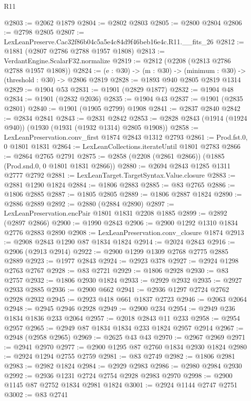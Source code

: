 \begin{lexlean}{R11}
\begin{coremodule}
@2803 := @2062 @1879
@2804 := @2802 @2803
@2805 := @2800 @2804
@2806 := @2798 @2805
@2807 := LexLeanPreserve.Cac32f86b04c5a5e4c84d9f46beb16e4c.R11.__fits_26
@2812 := @1881 (@2807 @2786 @2788 @1957 @1808)
@2813 := VerdantEngine.ScalarF32.normalize
@2819 := @2812 (@2208 (@2813 @2786 @2788 @1957 @1808))
@2824 := (e : @30) -> (m : @30) -> (minimum : @30) -> (threshold : @30) -> @2806 @2819
@2828 := @1893 @940 @2805 @2819 @1314
@2829 := @1904 @53
@2831 := @1901 (@2829 @1877)
@2832 := @1904 @48
@2834 := @1901 (@2832 @2036)
@2835 := @1904 @43
@2837 := @1901 (@2835 @2801)
@2840 := @1901 (@1905 @2799) @1908
@2841 := @2837 @2840
@2842 := @2834 @2841
@2843 := @2831 @2842
@2853 := @2828 @2843 (@1914 (@1924 @940)) (@1930 (@1931 (@1932 @1314) @2805 @1908))
@2858 := LexLeanPreservation.conv_first @1874 @2843 @1312 @2793
@2861 := Prod.fst.{0, 0} @1801 @1831
@2864 := LexLeanCollections.iterateUntil @1801 @2783
@2866 := @2864 @2765 @2791
@2875 := @2858 (@2208 (@2861 @2866)) (@1885 (Prod.snd.{0, 0} @1801 @1831 @2866))
@2880 := @2694 @2843 @1285 @1311 @2777 @2792
@2881 := LexLeanTarget.TargetSyntax.Value.closure
@2883 := @2881 @1290 @1824
@2884 := @1806 @2883
@2885 := @83 @2765
@2886 := @1806 @2885
@2887 := @1805 @2805
@2889 := @1806 @2887 @1824
@2890 := @2886 @2889
@2892 := @2880 (@2884 @2890)
@2897 := LexLeanPreservation.encPair @1801 @1831 @2208 @1885
@2899 := @2892 (@2897 @2866)
@2900 := @1990 @2843
@2906 := @2900 @1292 @1310 @1834 @2776 @2883 @2890
@2908 := LexLeanPreservation.conv_closure @1874
@2913 := @2908 @2843 @1290 @87 @1834 @1824
@2914 := @2024 @2843
@2916 := @2906 (@2913 @2914)
@2922 := @2900 @1299 @1309 @2768 @2775 @2885 @2889
@2923 := @1977 @2843
@2924 := @2923 @378
@2927 := @2924 @1298 @2763 @2767
@2928 := @83 @2721
@2929 := @1806 @2928
@2930 := @83 @2757
@2932 := @1806 @2930 @1824
@2933 := @2929 @2932
@2935 := @2927 @2933 @2885
@2936 := @2900 @662
@2941 := @2936 @1297 @2724 @2762 @2928 @2932
@2945 := @2923 @418 @661 @1837 @2723
@2946 := @2063 @2064
@2948 := @2945 @2946 @2928
@2949 := @2900 @234
@2954 := @2949 @236 @1834 @1836 @233 @2064
@2957 := @2018 @2843 @11 @233
@2958 := @2954 @2957
@2965 := @2949 @87 @1834 @1834 @233 @1824 @2957 @2914
@2967 := @2948 (@2958 @2965)
@2969 := @2625 @43 @43
@2970 := @2967 @2969
@2971 := @2941 @2970
@2977 := @2900 @1295 @87 @2760 @1834 @2930 @1824
@2980 := @2924 @1294 @2755 @2759
@2981 := @83 @2749
@2982 := @1806 @2981
@2983 := @2982 @1824
@2984 := @2929 @2983
@2986 := @2980 @2984 @2930
@2992 := @2936 @1231 @2724 @2754 @2928 @2983 @2970
@2998 := @2900 @1145 @87 @2752 @1834 @2981 @1824
@3001 := @2924 @1144 @2747 @2751
@3002 := @83 @2741

\end{coremodule}
\end{lexlean}
